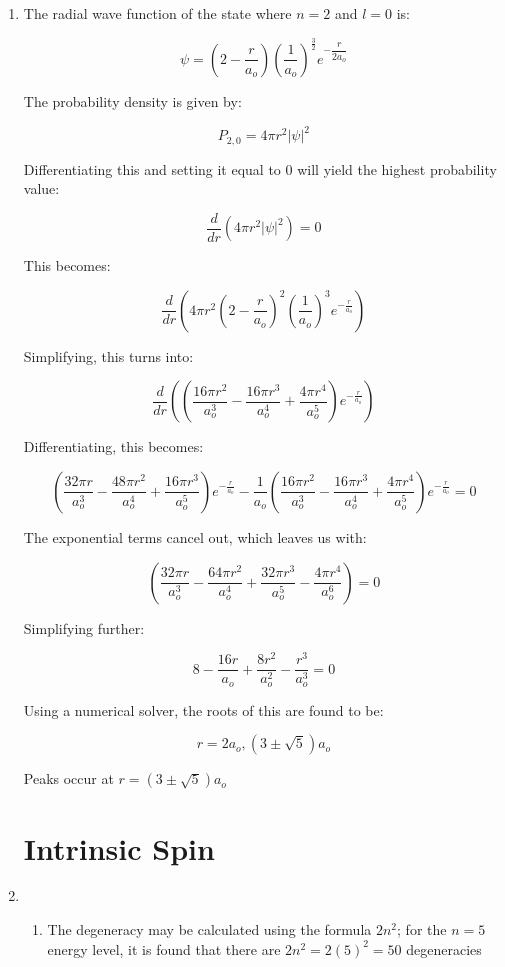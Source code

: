 \begin{enumerate}
  \item The radial wave function of the state where $n=2$ and $l=0$ is:

    $$\psi=\left( 2-\frac{r}{a_o} \right)\left( \frac{1}{a_o} \right)^{\frac{3}{2}}e^{-\dfrac{r}{2a_o}}$$

    The probability density is given by:

  $$P_{2,0}=4\pi r^2|\psi|^2$$

  Differentiating this and setting it equal to 0 will yield the highest probability value:

  $$\dfrac{d}{dr}\left( 4\pi r^2|\psi|^2 \right)=0$$

  This becomes:

  $$\frac{d}{dr}\left( 4\pi r^2\left( 2-\frac{r}{a_o} \right)^2\left( \frac{1}{a_o} \right)^3  e^{-\frac{r}{a_o}}\right)$$

  Simplifying, this turns into:

  $$\frac{d}{dr}\left( \left( \frac{16\pi r^2}{a_o^3}-\frac{16\pi r^3}{a_o^4}+\frac{4\pi r^4}{a_o^5} \right)e^{-\frac{r}{a_o}} \right)$$

  Differentiating, this becomes:

  $$\left( \frac{32\pi r}{a_o^3}-\frac{48\pi r^2}{a_o^4}+\frac{16\pi r^3}{a_o^5} \right)e^{-\frac{r}{a_o}}-\frac{1}{a_o}\left( \frac{16\pi r^2}{a_o^3}-\frac{16\pi r^3}{a_o^4}+\frac{4\pi r^4}{a_o^5} \right)e^{-\frac{r}{a_o}}=0$$

  The exponential terms cancel out, which leaves us with:

  $$\left( \frac{32\pi r}{a_o^3}-\frac{64\pi r^2}{a_o^4}+\frac{32\pi r^3}{a_o^5}-\frac{4\pi r^4}{a_o^6} \right)=0$$

  Simplifying further:

  $$8-\frac{16r}{a_o}+\frac{8r^2}{a_o^2}-\frac{r^3}{a_o^3}=0$$

  Using a numerical solver, the roots of this are found to be:

  $$r=2a_o,(3\pm\sqrt{5})a_o$$

  Peaks occur at $r=(3\pm\sqrt{5})a_o$

    \section*{Intrinsic Spin}

  \item

    \begin{enumerate}

      \item The degeneracy may be calculated using the formula $2n^2$; for the $n=5$ energy level, it is found that there are $2n^2=2(5)^2=50$ degeneracies


\end{enumerate}
\end{enumerate}
